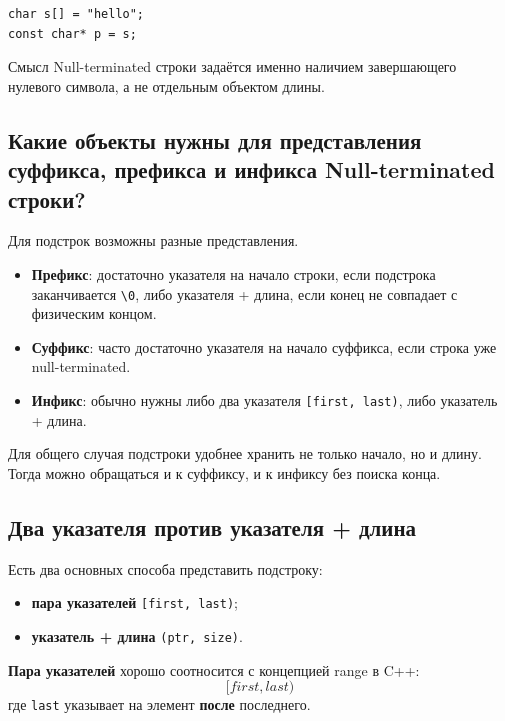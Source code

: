 \begin{example}
\begin{verbatim}
char s[] = "hello";
const char* p = s;
\end{verbatim}
\end{example}

\begin{remark}
Смысл Null-terminated строки задаётся именно наличием завершающего нулевого символа, а не отдельным объектом длины.
\end{remark}

\subsection{Какие объекты нужны для представления суффикса, префикса и инфикса Null-terminated строки?}
Для подстрок возможны разные представления.

\begin{itemize}
    \item \textbf{Префикс}: достаточно указателя на начало строки, если подстрока заканчивается \texttt{\textbackslash0}, либо указателя + длина, если конец не совпадает с физическим концом.
    \item \textbf{Суффикс}: часто достаточно указателя на начало суффикса, если строка уже null-terminated.
    \item \textbf{Инфикс}: обычно нужны либо два указателя \texttt{[first, last)}, либо указатель + длина.
\end{itemize}

\begin{remark}
Для общего случая подстроки удобнее хранить не только начало, но и длину. Тогда можно обращаться и к суффиксу, и к инфиксу без поиска конца.
\end{remark}

\subsection{Два указателя против указателя + длина}
Есть два основных способа представить подстроку:
\begin{itemize}
    \item \textbf{пара указателей} \texttt{[first, last)};
    \item \textbf{указатель + длина} \texttt{(ptr, size)}.
\end{itemize}

\textbf{Пара указателей} хорошо соотносится с концепцией range в C++:
\[
[first, last)
\]
где \texttt{last} указывает на элемент \textbf{после} последнего.


